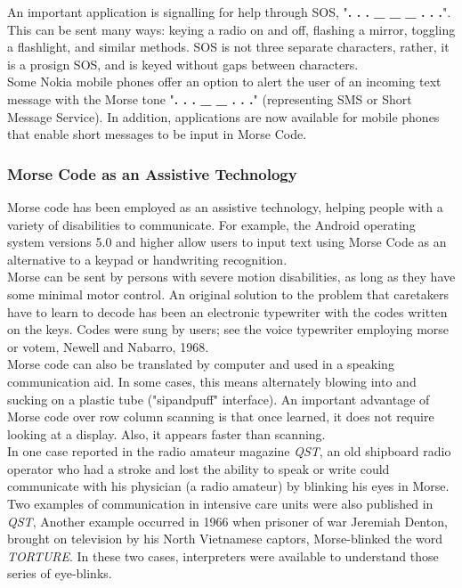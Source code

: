 \documentclass[14pt]{report}
\begin{document}
					An important application is signalling for help through SOS, "\textbf{. . . \_ \_ \_ . . .}". This can be sent many ways: keying a radio on and off, flashing a mirror, toggling a flashlight, and similar methods. SOS is not three separate characters, rather, it is a prosign SOS, and is keyed without gaps between characters.\\
					
					Some Nokia mobile phones offer an option to alert the user of an incoming text message with the Morse tone "\textbf{. . . \_ \_ . . .}" (representing SMS or Short Message Service). In addition, applications are now available for mobile phones that enable short messages to be input in Morse Code.
				
					\subsubsection{Morse Code as an Assistive Technology}
						Morse code has been employed as an assistive technology, helping people with a variety of disabilities to communicate. For example, the Android operating system versions 5.0 and higher allow users to input text using Morse Code as an alternative to a keypad or handwriting recognition.\\

						Morse can be sent by persons with severe motion disabilities, as long as they have some minimal motor control. An original solution to the problem that caretakers have to learn to decode has been an electronic typewriter with the codes written on the keys. Codes were sung by users; see the voice typewriter employing morse or votem, Newell and Nabarro, 1968.\\

						Morse code can also be translated by computer and used in a speaking communication aid. In some cases, this means alternately blowing into and sucking on a plastic tube ("sip\-and\-puff" interface). An important advantage of Morse code over row column scanning is that once learned, it does not require looking at a display. Also, it appears faster than scanning.\\

						In one case reported in the radio amateur magazine \textit{QST}, an old shipboard radio operator who had a stroke and lost the ability to speak or write could communicate with his physician (a radio amateur) by blinking his eyes in Morse. Two examples of communication in intensive care units were also published in \textit{QST}, Another example occurred in 1966 when prisoner of war Jeremiah Denton, brought on television by his North Vietnamese captors, Morse-blinked the word \textit{TORTURE}. In these two cases, interpreters were available to understand those series of eye-blinks.
					
\end{document}
